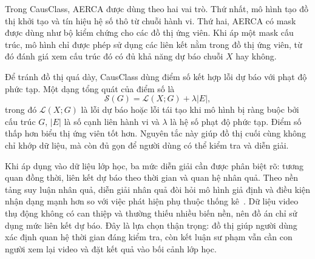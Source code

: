 Trong CausClass, AERCA được dùng theo hai vai trò. Thứ nhất, mô hình tạo đồ thị khởi tạo và tín hiệu hệ số thô từ chuỗi hành vi. Thứ hai, AERCA có mask được dùng như bộ kiểm chứng cho các đồ thị ứng viên. Khi áp một mask cấu trúc, mô hình chỉ được phép sử dụng các liên kết nằm trong đồ thị ứng viên, từ đó đánh giá xem cấu trúc đó có đủ khả năng dự báo chuỗi \(X\) hay không.

Để tránh đồ thị quá dày, CausClass dùng điểm số kết hợp lỗi dự báo với phạt độ phức tạp. Một dạng tổng quát của điểm số là
\begin{equation}
\label{eq:graph-score}
    \mathcal{S}(G) = \mathcal{L}(X;G) + \lambda |E|,
\end{equation}
trong đó \(\mathcal{L}(X;G)\) là lỗi dự báo hoặc lỗi tái tạo khi mô hình bị ràng buộc bởi cấu trúc \(G\), \(|E|\) là số cạnh liên hành vi và \(\lambda\) là hệ số phạt độ phức tạp. Điểm số thấp hơn biểu thị ứng viên tốt hơn. Nguyên tắc này giúp đồ thị cuối cùng không chỉ khớp dữ liệu, mà còn đủ gọn để người dùng có thể kiểm tra và diễn giải.

Khi áp dụng vào dữ liệu lớp học, ba mức diễn giải cần được phân biệt rõ: tương quan đồng thời, liên kết dự báo theo thời gian và quan hệ nhân quả. Theo nền tảng suy luận nhân quả, diễn giải nhân quả đòi hỏi mô hình giả định và điều kiện nhận dạng mạnh hơn so với việc phát hiện phụ thuộc thống kê \,\cite{pearl2009causality,peters2017elements}. Dữ liệu video thụ động không có can thiệp và thường thiếu nhiều biến nền, nên đồ án chỉ sử dụng mức liên kết dự báo. Đây là lựa chọn thận trọng: đồ thị giúp người dùng xác định quan hệ thời gian đáng kiểm tra, còn kết luận sư phạm vẫn cần con người xem lại video và đặt kết quả vào bối cảnh lớp học.